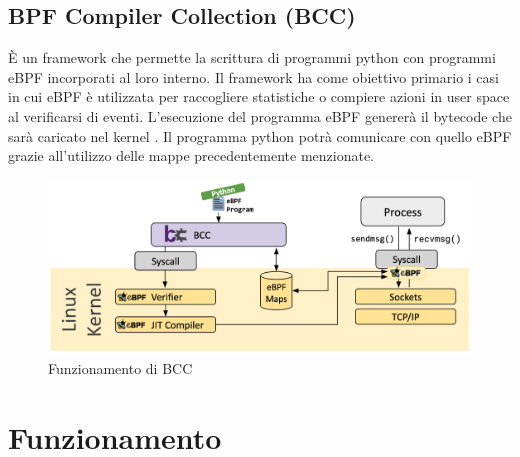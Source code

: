 \subsection{BPF Compiler Collection (BCC)}
 
È un framework che permette la scrittura di programmi python con programmi eBPF incorporati al loro interno. Il framework ha come obiettivo primario i casi in cui eBPF è utilizzata per raccogliere statistiche o compiere azioni in user space al verificarsi di eventi. L'esecuzione del programma eBPF genererà il bytecode che sarà caricato nel kernel \cite{ebpf.io}.
Il programma python potrà comunicare con quello eBPF grazie all'utilizzo delle mappe precedentemente menzionate.

\begin{figure}[]
    \label{fig:bcc}
    \includegraphics[width=\hsize]{images/mitigazione/bcc.png}
    \caption{Funzionamento di BCC \cite{ebpf.io}}
    \centering
\end{figure}

\section{Funzionamento}





